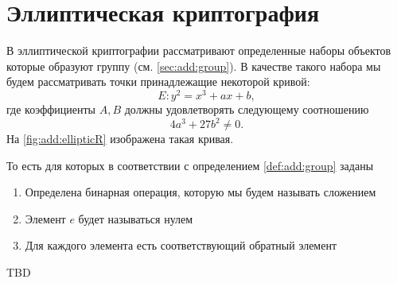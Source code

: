 \section{Эллиптическая криптография}

В эллиптической криптографии рассматривают определенные наборы
объектов которые образуют группу (см. \autoref{sec:add:group}). В
качестве такого набора мы будем рассматривать точки принадлежащие
некоторой кривой: 
\[
E: y^2 = x^3 +a x + b,
\]
где коэффициенты $A,B$ должны удовлетворять следующему соотношению
\[
4 a^3 + 27 b^2 \ne 0.
\]
На \autoref{fig:add:ellipticR} изображена такая кривая.



То
есть для которых в соответствии с определением \ref{def:add:group}
заданы 
\begin{enumerate}
\item Определена бинарная операция, которую мы будем называть сложением
\item Элемент $e$ будет называться нулем
\item Для каждого элемента есть соответствующий обратный элемент
\end{enumerate}
TBD
